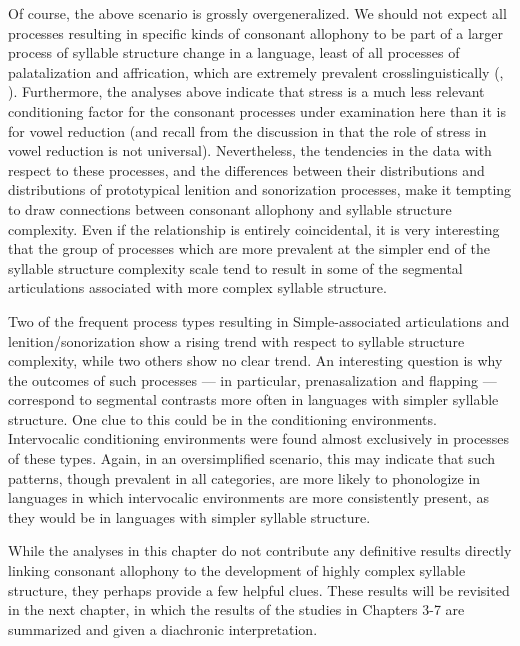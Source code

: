   Of course, the above scenario is grossly overgeneralized. We should not expect all processes resulting in specific kinds of consonant allophony to be part of a larger process of syllable structure change in a language, least of all processes of palatalization and affrication, which are extremely prevalent crosslinguistically (\citealt{Bhat1978}, \citealt{Bateman2007}). Furthermore, the analyses above indicate that stress is a much less relevant conditioning factor for the consonant processes under examination here than it is for vowel reduction (and recall from the discussion in  that the role of stress in vowel reduction is not universal). Nevertheless, the tendencies in the data with respect to these processes, and the differences between their distributions and distributions of prototypical lenition and sonorization processes, make it tempting to draw connections between consonant allophony and syllable structure complexity. Even if the relationship is entirely coincidental, it is very interesting that the group of processes which are more prevalent at the simpler end of the syllable structure complexity scale tend to result in some of the segmental articulations associated with more complex syllable structure.

  Two of the frequent process types resulting in Simple-associated articulations and lenition/sonorization show a rising trend with respect to syllable structure complexity, while two others show no clear trend. An interesting question is why the outcomes of such processes — in particular, prenasalization and flapping — correspond to segmental contrasts more often in languages with simpler syllable structure. One clue to this could be in the conditioning environments. Intervocalic conditioning environments were found almost exclusively in processes of these types. Again, in an oversimplified scenario, this may indicate that such patterns, though prevalent in all categories, are more likely to phonologize in languages in which intervocalic environments are more consistently present, as they would be in languages with simpler syllable structure.

  While the analyses in this chapter do not contribute any definitive results directly linking consonant allophony to the development of highly complex syllable structure, they perhaps provide a few helpful clues. These results will be revisited in the next chapter, in which the results of the studies in Chapters 3-7 are summarized and given a diachronic interpretation.

